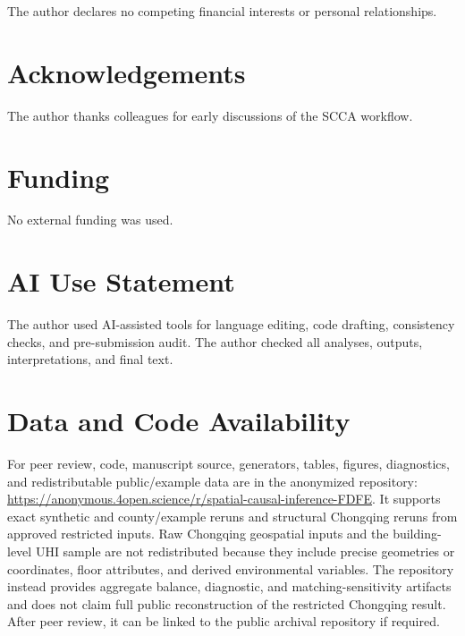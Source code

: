 \documentclass{article}
\begin{document}
The author declares no competing financial interests or personal relationships.

\section*{Acknowledgements}

The author thanks colleagues for early discussions of the SCCA workflow.

\section*{Funding}

No external funding was used.

\section*{AI Use Statement}

The author used AI-assisted tools for language editing, code drafting, consistency checks, and pre-submission audit. The author checked all analyses, outputs, interpretations, and final text.

\section*{Data and Code Availability}

For peer review, code, manuscript source, generators, tables, figures, diagnostics, and redistributable public/example data are in the anonymized repository: \url{https://anonymous.4open.science/r/spatial-causal-inference-FDFE}. It supports exact synthetic and county/example reruns and structural Chongqing reruns from approved restricted inputs. Raw Chongqing geospatial inputs and the building-level UHI sample are not redistributed because they include precise geometries or coordinates, floor attributes, and derived environmental variables. The repository instead provides aggregate balance, diagnostic, and matching-sensitivity artifacts and does not claim full public reconstruction of the restricted Chongqing result. After peer review, it can be linked to the public archival repository if required.
\end{document}
